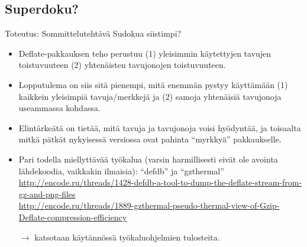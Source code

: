 \documentclass[pdf,10pt]{beamer}
\begin{document}
\subsection{Superdoku?}
\begin{frame}{Toteutus: Sommittelutehtävä Sudokua siistimpi?}
  \begin{itemize}
    \item Deflate-pakkauksen teho perustuu (1) yleisimmin käytettyjen
      tavujen toistuvuuteen (2) yhtenäisten tavujonojen
      toistuvuuteen.
    \item Lopputulema on siis sitä pienempi, mitä enemmän pystyy
      käyttämään (1) kaikkein yleisimpiä tavuja/merkkejä ja (2) samoja
      yhtenäisiä tavujonoja useammassa kohdassa.
    \item Elintärkeätä on tietää, mitä tavuja ja tavujonoja voisi
      hyödyntää, ja toisaalta mitkä pätkät nykyisessä versiossa ovat
      pahinta ``myrkkyä'' pakkaukselle.
    \item Pari todella miellyttävää työkalua (varsin harmillisesti
      eivät ole avointa lähdekoodia, vaikkakin ilmaisia): ``defdb'' ja
      ``gzthermal''\\{\tiny
      \url{http://encode.ru/threads/1428-defdb-a-tool-to-dump-the-deflate-stream-from-gz-and-png-files}\\
      \url{http://encode.ru/threads/1889-gzthermal-pseudo-thermal-view-of-Gzip-Deflate-compression-efficiency}\\}
    \item[$\rightarrow$] katsotaan käytännössä työkaluohjelmien tulosteita.
  \end{itemize}
\end{frame}
\end{document}
